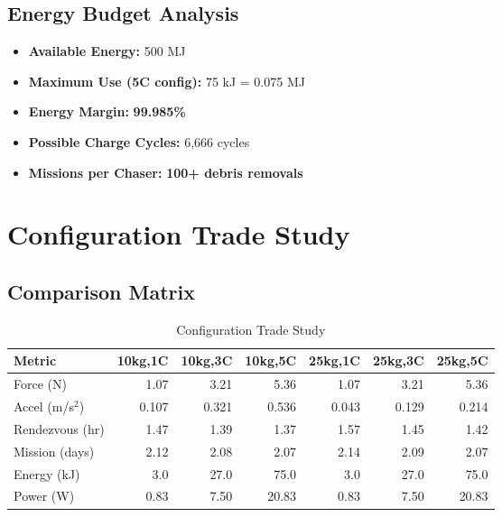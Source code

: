 \documentclass[11pt,a4paper]{article}
\newcommand{\highlight}[1]{\textcolor{highlightgreen}{\textbf{#1}}}
\begin{document}
\subsection{Energy Budget Analysis}

\begin{itemize}[leftmargin=*]
    \item \textbf{Available Energy:} 500 MJ
    \item \textbf{Maximum Use (5C config):} 75 kJ = 0.075 MJ
    \item \textbf{Energy Margin:} \highlight{99.985\%}
    \item \textbf{Possible Charge Cycles:} 6,666 cycles
    \item \textbf{Missions per Chaser:} \highlight{100+ debris removals}
\end{itemize}

\section{Configuration Trade Study}

\subsection{Comparison Matrix}

\begin{table}[h!]
\centering
\caption{Configuration Trade Study}
\label{tab:trade}
\scriptsize
\begin{tabular}{lrrrrrr}
\toprule
\textbf{Metric} & \textbf{10kg,1C} & \textbf{10kg,3C} & \textbf{10kg,5C} & \textbf{25kg,1C} & \textbf{25kg,3C} & \textbf{25kg,5C} \\
\midrule
Force (N) & 1.07 & 3.21 & 5.36 & 1.07 & 3.21 & 5.36 \\
Accel (m/s$^2$) & 0.107 & 0.321 & 0.536 & 0.043 & 0.129 & 0.214 \\
Rendezvous (hr) & 1.47 & 1.39 & 1.37 & 1.57 & 1.45 & 1.42 \\
Mission (days) & 2.12 & 2.08 & 2.07 & 2.14 & 2.09 & 2.07 \\
Energy (kJ) & 3.0 & 27.0 & 75.0 & 3.0 & 27.0 & 75.0 \\
Power (W) & 0.83 & 7.50 & 20.83 & 0.83 & 7.50 & 20.83 \\
\bottomrule
\end{tabular}
\end{table}
\end{document}
